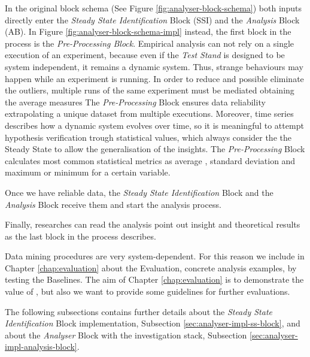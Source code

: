 In the original block schema (See Figure \ref{fig:analyser-block-schema}) both inputs directly enter the \textit{Steady State Identification} Block (SSI) and the \textit{Analysis} Block (AB). In Figure \ref{fig:analyser-block-schema-impl}   instead, the first block in the process is the \textit{Pre-Processing Block}. Empirical analysis can not rely on a single execution of an experiment, because even if the \textit{Test Stand} is designed to be system independent, it remains a dynamic system. Thus, strange behaviours may happen while an experiment is running. In order to reduce and possible eliminate the outliers, multiple runs of the same experiment must be mediated obtaining the average measures The \textit{Pre-Processing} Block ensures data reliability extrapolating a unique dataset from multiple executions. Moreover, time series describes how a dynamic system evolves over time, so it is meaningful to attempt hypothesis verification trough statistical values, which always consider the the Steady State to allow the generalisation of the insights. The \textit{Pre-Processing} Block calculates most common statistical metrics as average , standard deviation and maximum or minimum for a certain variable.


Once we have reliable data, the \textit{Steady State Identification} Block and the \textit{Analysis} Block receive them and start the analysis process. 

Finally, researches can read the analysis point out insight and theoretical results as the last block in the process describes.

Data mining procedures are very system-dependent. For this reason we include in Chapter \ref{chap:evaluation} about the \name Evaluation, concrete analysis examples, by testing the Baselines. The aim of Chapter \ref{chap:evaluation} is to demonstrate the value of \namens, but also we want to provide some guidelines for further evaluations.

The following subsections contains further details about the \textit{Steady State Identification} Block implementation, Subsection \ref{sec:analyser-impl-ss-block}, and about the \textit{Analyser} Block with the investigation stack, Subsection \ref{sec:analyser-impl-analysis-block}.

